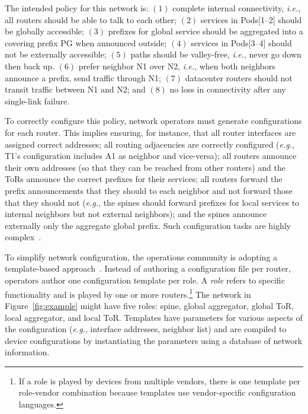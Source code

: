 \documentclass[numbers, 10pt, preprint]{sigplanconf}
\newcommand{\todo}[1]{\textcolor{red}{[TODO: #1]}}
\newcommand{\EG}{\emph{e.g.}}
\newcommand{\IE}{\emph{i.e.}}
\begin{document}


The intended policy for this network is:
$(1)$ complete internal connectivity, \IE, all routers should be able to talk to each other;
$(2)$ services in Pods[1--2] should be globally accessible;
$(3)$ prefixes for global service should be aggregated into a covering prefix PG when announced outside;
$(4)$ services in Pods[3--4] should not be externally accessible;
$(5)$ paths should be valley-free, \IE, never go down then back up.
$(6)$ prefer neighbor N1 over N2, \IE, when both neighbors announce a prefix, send traffic through N1;
$(7)$ datacenter routers should not transit traffic between N1 and N2; and
$(8)$ no loss in connectivity after any single-link failure.

To correctly configure this policy, network operators must generate configurations for each router. This implies ensuring, for instance, that all router interfaces are assigned correct addresses; all routing adjacencies are correctly configured (\EG, T1's configuration includes A1 as neighbor and vice-versa); all routers announce their own addresses (so that they can be reached from other routers) and the ToRs announce the correct prefixes for their services; all routers  forward the prefix announcements that they should to each neighbor and not forward those that they should not (\EG, the spines should forward prefixes for local services to internal neighbors but not external neighbors); and the spines announce externally only the aggregate global prefix. Such configuration tasks are highly complex~\cite{juniper-study,bgpmon,batfish,propane}.

To simplify network configuration, the operations community is adopting a template-based approach~\cite{hatch,thwack}. Instead of authoring a configuration file per router, operators author one configuration template per role.
%
A {\em role} refers to specific functionality and is played by one or more routers.\footnote{If a role is played by devices from multiple vendors, there is one template per role-vendor combination because templates use vendor-specific configuration languages.}
%
The network in Figure~\ref{fig:example} might have five roles: spine, global aggregator, global ToR, local aggregator, and local ToR.
%
Templates have parameters for various aspects of the configuration (\EG, interface addresses, neighbor list) and are compiled to device configurations by instantiating the parameters using a database of network information.
\end{document}
